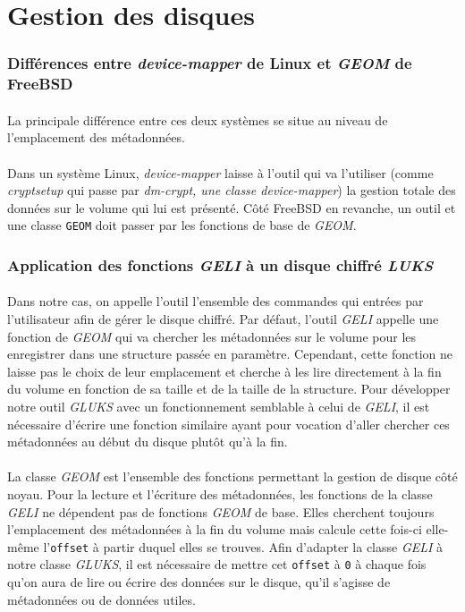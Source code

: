 \section{Gestion des disques}

\subsubsection{Différences entre \textit{device-mapper} de Linux et
  \textit{GEOM} de FreeBSD}
\paragraph{}
La principale différence entre ces deux systèmes se situe au niveau de
l'emplacement des métadonnées.
\paragraph{}
Dans un système Linux, \textit{device-mapper} laisse à l'outil qui va l'utiliser
(comme \textit{cryptsetup} qui passe par \textit{dm-crypt, une classe
  \textit{device-mapper}}) la gestion totale des données sur le volume qui lui
est présenté. Côté FreeBSD en revanche, un outil et une classe \texttt{GEOM}
doit passer par les fonctions de base de \textit{GEOM}.

\subsubsection{Application des fonctions \textit{GELI} à un disque chiffré \textit{LUKS}}
\paragraph{}
Dans notre cas, on appelle l'outil l'ensemble des commandes qui entrées par
l'utilisateur afin de gérer le disque chiffré. Par défaut, l'outil \textit{GELI}
appelle une fonction de \textit{GEOM} qui va chercher les métadonnées sur le
volume pour les enregistrer dans une structure passée en paramètre. Cependant,
cette fonction ne laisse pas le choix de leur emplacement et cherche à les lire
directement à la fin du volume en fonction de sa taille et de la taille de la
structure. Pour développer notre outil \textit{GLUKS} avec un fonctionnement
semblable à celui de \textit{GELI}, il est nécessaire d'écrire une fonction
similaire ayant pour vocation d'aller chercher ces métadonnées au début du
disque plutôt qu'à la fin.
\paragraph{}
La classe \textit{GEOM} est l'ensemble des fonctions permettant la gestion de
disque côté noyau. Pour la lecture et l'écriture des métadonnées, les fonctions
de la classe \textit{GELI} ne dépendent pas de fonctions \textit{GEOM} de base.
Elles cherchent toujours l'emplacement des métadonnées à la fin du volume mais
calcule cette fois-ci elle-même l'\texttt{offset} à partir duquel elles se
trouves. Afin d'adapter la classe \textit{GELI} à notre classe \textit{GLUKS},
il est nécessaire de mettre cet \texttt{offset} à \texttt{0} à chaque fois qu'on
aura de lire ou écrire des données sur le disque, qu'il s'agisse de métadonnées
ou de données utiles. 

